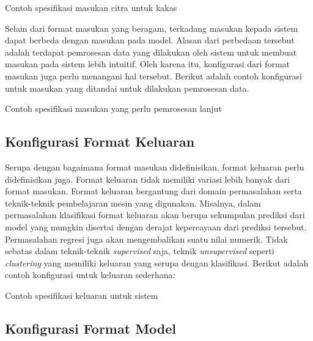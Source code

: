 \begin{code}
	\caption{Contoh spesifikasi masukan citra untuk kakas}
	\label{listing:2}
\end{code}

Selain dari format masukan yang beragam, terkadang masukan kepada sistem dapat berbeda dengan masukan pada model.
Alasan dari perbedaan tersebut adalah terdapat pemrosesan data yang dilakukan oleh sistem untuk membuat masukan pada sistem lebih intuitif.
Oleh karena itu, konfigurasi dari format masukan juga perlu menangani hal tersebut.
Berikut adalah contoh konfigurasi untuk masukan yang ditandai untuk dilakukan pemrosesan data.

\begin{code}
	\caption{Contoh spesifikasi masukan yang perlu pemrosesan lanjut}
	\label{listing:3}
\end{code}

\subsection{Konfigurasi Format Keluaran}\label{section:03-output-format}

Serupa dengan bagaimana format masukan didefinisikan, format keluaran perlu didefinisikan juga.
Format keluaran tidak memiliki variasi lebih banyak dari format masukan.
Format keluaran bergantung dari domain permasalahan serta teknik-teknik pembelajaran mesin yang digunakan.
Misalnya, dalam permasalahan klasifikasi format keluaran akan berupa sekumpulan prediksi dari model yang mungkin disertai dengan derajat kepercayaan dari prediksi tersebut.
Permasalahan regresi juga akan mengembalikan suatu nilai numerik.
Tidak sebatas dalam teknik-teknik \textit{supervised} saja, teknik \textit{unsupervised} seperti \textit{clustering} yang memiliki keluaran yang serupa dengan klasifikasi.
Berikut adalah contoh konfigurasi untuk keluaran sederhana:

\begin{code}
	\caption{Contoh spesifikasi keluaran untuk sistem}
	\label{listing:4}
\end{code}

\subsection{Konfigurasi Format Model}\label{section:03-model-format}

